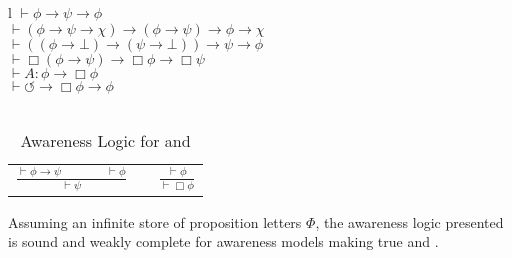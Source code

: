 \begin{table}[h]
  \begin{tabular}{l}
    $\vdash \phi \rightarrow \psi \rightarrow \phi$\\
    $\vdash (\phi \rightarrow \psi \rightarrow \chi) \rightarrow (\phi
    \rightarrow \psi) \rightarrow \phi \rightarrow \chi$\\
    $\vdash ((\phi \rightarrow \bot) \rightarrow (\psi \rightarrow \bot))
    \rightarrow \psi \rightarrow \phi$\\
    $\vdash \Box(\phi \rightarrow \psi) \rightarrow \Box \phi \rightarrow \Box
    \psi$\\
    $\vdash A : \phi \rightarrow \Box \phi$\\
    $\vdash \circlearrowleft \rightarrow \Box \phi \rightarrow \phi$\\
    \\
    \begin{tabular}{lll}
      $\frac{\vdash \phi \rightarrow \psi \hspace{4em} \vdash \phi}{\vdash
      \psi}$ & {\hspace{6em}} & $\frac{\vdash \phi}{\vdash \Box \phi}$
    \end{tabular}
  \end{tabular}
  \caption{\label{logic1}Awareness Logic for  and
  }
\end{table}

\begin{theorem}
  \label{completeness1}Assuming an infinite store of proposition letters
  $\Phi$, the awareness logic presented is sound and weakly complete for
  awareness models making true  and .
\end{theorem}

